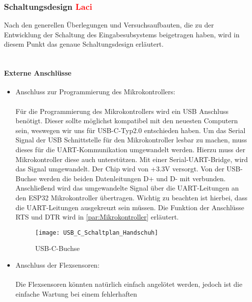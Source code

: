 \documentclass[titlepage,12pt,twoside]{article}
\begin{document}
\newpage
\subsubsection{Schaltungsdesign \textcolor{red}{Laci}}
Nach den generellen Überlegungen und Versuchsaufbauten, die zu der Entwicklung der Schaltung des Eingabesubsystems beigetragen haben, wird in diesem Punkt 
das genaue Schaltungsdesign erläutert. \\
\\
\paragraph{Externe Anschlüsse}
\label{par:Externe Anschlüsse}
\hfill \break
\hfill \break
\begin{itemize}
	\item Anschluss zur Programmierung des Mikrokontrollers: \\
		  \\
		  Für die Programmierung des Mikrokontrollers wird ein USB Anschluss benötigt. Dieser sollte möglichst kompatibel mit
		  den neuesten Computern sein, weswegen wir uns für USB-C-Typ2.0 entschieden haben. Um das Serial Signal der USB Schnittstelle
		  für den Mikrokontroller lesbar zu machen, muss dieses für die UART-Kommunikation umgewandelt werden. Hierzu muss der Mikrokontroller
		  diese auch unterstützen. Mit einer Serial-UART-Bridge, wird das Signal umgewandelt. Der Chip wird von +3.3V versorgt.
		  Von der USB-Buchse werden die beiden Datenleitungen D+ und D- mit verbunden. Anschließend wird das umgewandelte Signal 
		  über die UART-Leitungen an den ESP32 Mikrokontroller übertragen. Wichtig zu beachten ist hierbei, dass die UART-Leitungen
		  ausgekreuzt sein müssen. Die Funktion der Anschlüsse RTS und DTR wird in \autoref{par:Mikrokontroller} erläutert. \\
		  \begin{figure}[H]
			\begin{center}
				\scalebox{0.5}
				{\texttt{[image: USB\_C\_Schaltplan\_Handschuh]}}
				\caption{USB-C-Buchse}
				\label{fig:USB_C_Schaltplan_Handschuh}				
			\end{center}
		\end{figure}
	\item Anschluss der Flexsensoren: \\
		  \\
		  Die Flexsensoren könnten natürlich einfach angelötet werden, jedoch ist die einfache Wartung bei einem fehlerhaften

\end{itemize}
\end{document}
